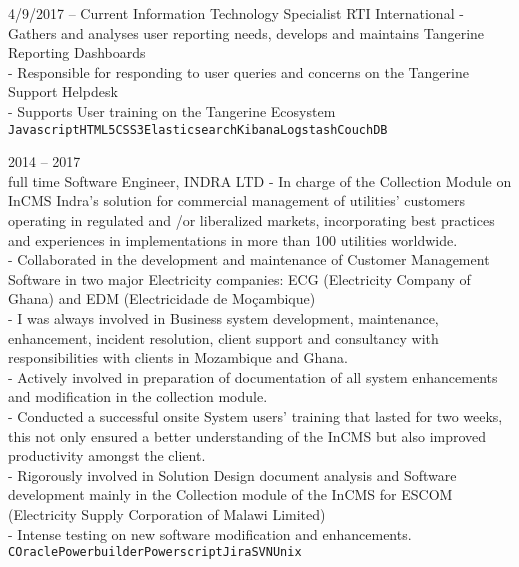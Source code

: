 \documentclass[9pt]{developercv} %
\begin{document}
\begin{entrylist}
	\entry
		{4/9/2017 -- Current}
		{Information Technology Specialist}
		{RTI International}
		{- Gathers and analyses user reporting needs, develops and maintains Tangerine Reporting Dashboards\\
			- Responsible for responding to user queries and concerns on the Tangerine Support Helpdesk\\
			- Supports User training on the Tangerine Ecosystem\\
		\texttt{Javascript}\slashsep\texttt{HTML5}\slashsep\texttt{CSS3}\slashsep\texttt{Elasticsearch}\slashsep\texttt{Kibana}\slashsep\texttt{Logstash}\slashsep\texttt{CouchDB}}	
			

	\entry
		{2014 -- 2017\\\footnotesize{full time}}
		{Software Engineer,}
		{INDRA LTD}
		{   - 	In charge of the Collection Module on InCMS Indra’s solution for commercial management of utilities’ customers operating in regulated and /or liberalized markets, incorporating best practices and experiences in implementations in more than 100 utilities worldwide.\\
			-  	Collaborated in the development and maintenance of Customer Management Software in two major Electricity companies: ECG (Electricity Company of Ghana) and EDM (Electricidade de Moçambique)\\
			- I was always involved in Business system development, maintenance, enhancement, incident resolution, client support and consultancy with responsibilities with clients in Mozambique and Ghana.\\
			- 	Actively involved in  preparation of documentation of all system enhancements and modification in the collection module.\\
			-  Conducted a successful onsite System users’ training that lasted for two weeks, this not only ensured a better understanding of the InCMS but also improved productivity amongst the client.\\
			- Rigorously involved in Solution Design document analysis and Software development mainly in the Collection module of the InCMS for ESCOM (Electricity Supply Corporation of Malawi Limited)\\
		   - 	Intense testing on new software modification and enhancements.\\
			\texttt{C}\slashsep\texttt{Oracle}\slashsep\texttt{Powerbuilder}\slashsep\texttt{Powerscript}\slashsep\texttt{Jira}\slashsep\texttt{SVN}\slashsep\texttt{Unix}}\\\\\\\\\\\\\\\\\\\\\\\\\\
\end{entrylist}
\end{document}
